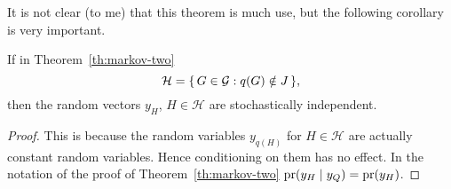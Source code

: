 It is not clear (to me) that this theorem is much use,
but the following corollary is very important.
\begin{corollary} \label{cor:independent}
If in Theorem~\ref{th:markov-two}
$$
   \mathcal{H} = \{\,  G \in \mathcal{G} : q(G) \notin J  \,\},
$$
then the random vectors
$y_H$, $H \in \mathcal{H}$ are stochastically independent.
\end{corollary}
\begin{proof}
This is because the random variables $y_{q(H)}$ for $H \in \mathcal{H}$
are actually constant random variables.  Hence conditioning on them
has no effect.  In the notation of the proof of Theorem~\ref{th:markov-two}
$\operatorname{pr}( y_H \mid y_{Q} ) = \operatorname{pr}( y_H )$.
\end{proof}

